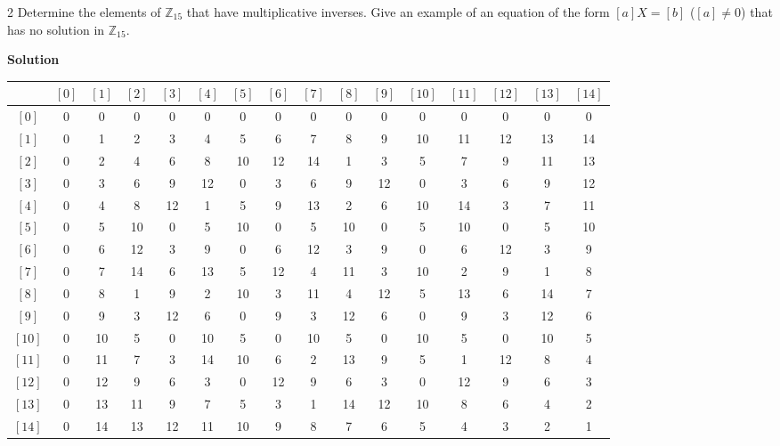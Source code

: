 \begin{problem}{2}
    Determine the elements of $\mathbb{Z}_{15}$ that have multiplicative inverses.
    Give an example of an equation of the form $[a]X = [b]$ ($[a] \not = 0$)
    that has no solution in $\mathbb{Z}_{15}$.
\end{problem}
\solved

\textbf{Solution}

\begin{center}
\begin{tabular}{c | *{15}{c@{\hskip 2pt}}}
 & $[0]$ & $[1]$ & $[2]$ & $[3]$ & $[4]$ & $[5]$ & $[6]$ & $[7]$ & $[8]$ & $[9]$ & $[10]$ & $[11]$ & $[12]$ & $[13]$ & $[14]$ \\
\hline
$[0]$  & 0 & 0 & 0 & 0 & 0 & 0 & 0 & 0 & 0 & 0 & 0 & 0 & 0 & 0 & 0 \\
$[1]$  & 0 & 1 & 2 & 3 & 4 & 5 & 6 & 7 & 8 & 9 & 10 & 11 & 12 & 13 & 14 \\
$[2]$  & 0 & 2 & 4 & 6 & 8 & 10 & 12 & 14 & 1 & 3 & 5 & 7 & 9 & 11 & 13 \\
$[3]$  & 0 & 3 & 6 & 9 & 12 & 0 & 3 & 6 & 9 & 12 & 0 & 3 & 6 & 9 & 12 \\
$[4]$  & 0 & 4 & 8 & 12 & 1 & 5 & 9 & 13 & 2 & 6 & 10 & 14 & 3 & 7 & 11 \\
$[5]$  & 0 & 5 & 10 & 0 & 5 & 10 & 0 & 5 & 10 & 0 & 5 & 10 & 0 & 5 & 10 \\
$[6]$  & 0 & 6 & 12 & 3 & 9 & 0 & 6 & 12 & 3 & 9 & 0 & 6 & 12 & 3 & 9 \\
$[7]$  & 0 & 7 & 14 & 6 & 13 & 5 & 12 & 4 & 11 & 3 & 10 & 2 & 9 & 1 & 8 \\
$[8]$  & 0 & 8 & 1 & 9 & 2 & 10 & 3 & 11 & 4 & 12 & 5 & 13 & 6 & 14 & 7 \\
$[9]$  & 0 & 9 & 3 & 12 & 6 & 0 & 9 & 3 & 12 & 6 & 0 & 9 & 3 & 12 & 6 \\
$[10]$ & 0 & 10 & 5 & 0 & 10 & 5 & 0 & 10 & 5 & 0 & 10 & 5 & 0 & 10 & 5 \\
$[11]$ & 0 & 11 & 7 & 3 & 14 & 10 & 6 & 2 & 13 & 9 & 5 & 1 & 12 & 8 & 4 \\
$[12]$ & 0 & 12 & 9 & 6 & 3 & 0 & 12 & 9 & 6 & 3 & 0 & 12 & 9 & 6 & 3 \\
$[13]$ & 0 & 13 & 11 & 9 & 7 & 5 & 3 & 1 & 14 & 12 & 10 & 8 & 6 & 4 & 2 \\
$[14]$ & 0 & 14 & 13 & 12 & 11 & 10 & 9 & 8 & 7 & 6 & 5 & 4 & 3 & 2 & 1 \\
\end{tabular}
\end{center}

